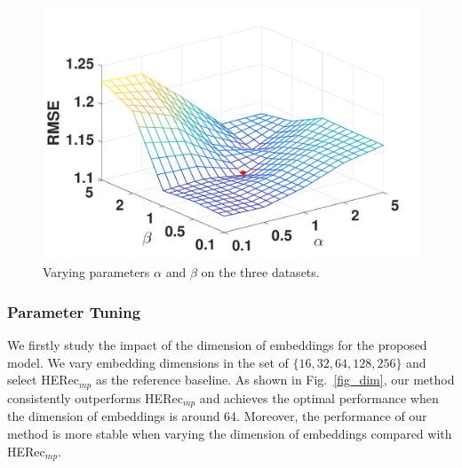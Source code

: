\begin{figure}[t]
{\begin{minipage}[t]{0.3\textwidth}
\includegraphics[width=1\textwidth]{image/reg_rmse_yelp.pdf}
\end{minipage}
}
\caption{\label{fig_reg}Varying parameters $\alpha$ and $\beta$ on the three datasets.}
\end{figure}



\subsubsection{Parameter Tuning}
We firstly study the impact of the dimension of embeddings for the proposed model. We vary embedding dimensions in the set of $\{16, 32, 64, 128, 256\}$ and select HERec$_{mp}$ as the reference baseline. As shown in Fig.~\ref{fig_dim}, our method consistently outperforms HERec$_{mp}$ and achieves the optimal performance when the dimension of embeddings is around 64. Moreover, the performance of our method is more stable when varying the dimension of embeddings compared with HERec$_{mp}$.

